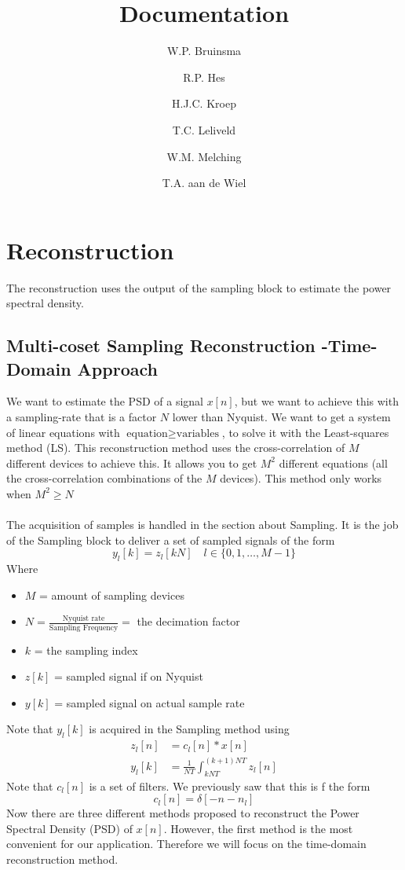 \documentclass[report, oneside, a4paper, openany]{memoir}
\title{Documentation}
\author{W.P. Bruinsma \and R.P. Hes \and H.J.C. Kroep \and T.C. Leliveld \and W.M. Melching \and T.A. aan de Wiel}
\begin{document}
\chapter{Reconstruction}
The reconstruction uses the output of the sampling block to estimate the power spectral density.

\section{Multi-coset Sampling Reconstruction -Time-Domain Approach}
We want to estimate the PSD of a signal $x[n]$, but we want to achieve this with a sampling-rate that is a factor $N$ lower than Nyquist. We want to get a system of linear equations with $\text{equation}\geq \text{variables}$, to solve it with the Least-squares method (LS). This reconstruction method uses the cross-correlation of $M$ different devices to achieve this. 
It allows you to get $M^2$ different equations (all the cross-correlation combinations of the $M$ devices). This method only works when $M^2\geq N$\\
\\
The acquisition of samples is handled in the section about Sampling. It is the job of the Sampling block to deliver a set of sampled signals of the form 
$$y_l[k] = z_l[kN] \quad l \in \{0,1,\dots, M-1\}$$
Where
\begin{itemize}
\item $M$  = amount of sampling devices
\item $N = \frac{\text{Nyquist rate}}{\text{Sampling Frequency}} = $ the decimation factor
\item $k$ = the sampling index
\item $z[k]$ = sampled signal if on Nyquist
\item $y[k]$ = sampled signal on actual sample rate
\end{itemize}

Note that $y_l[k]$ is acquired in the Sampling method using
\begin{align}
z_l[n] &= c_l[n]\ast x[n]\\
y_l[k] &= \frac{1}{NT}\int_{kNT}^{(k+1)NT} z_l[n]
\end{align}
Note that $c_l[n]$ is a set of filters. We previously saw that this is f the form 
$$
c_l[n] = \delta[-n -n_l]
$$
Now there are three different methods proposed to reconstruct the Power Spectral Density (PSD) of $x[n]$. 
However, the first method is the most convenient for our application. 
Therefore we will focus on the time-domain reconstruction method.
\end{document}
